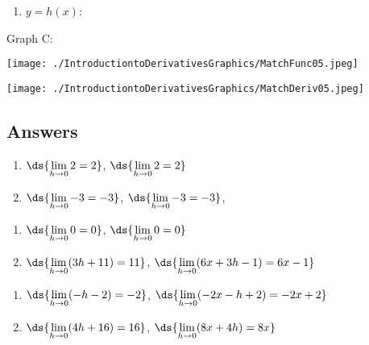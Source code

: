 \documentclass{ximera}
\begin{document}
\begin{center}
\begin{multicols}{2}
\begin{enumerate}
\item \label{MatchFcnDerivative2last}  $y = h(x)$:

\setcounter{HW}{\value{enumi}}
\end{enumerate}

Graph C:

\end{multicols}



\begin{multicols}{2}

\texttt{[image: ./IntroductiontoDerivativesGraphics/MatchFunc05.jpeg]}

\texttt{[image: ./IntroductiontoDerivativesGraphics/MatchDeriv05.jpeg]}

\end{multicols}

\end{center}


\newpage


\subsection{Answers}


\begin{enumerate}

\item $\ds{\lim_{h \rightarrow 0} 2 = 2}$, $\ds{\lim_{h \rightarrow 0} 2 = 2}$
\item $\ds{\lim_{h \rightarrow 0} -3 = -3}$, $\ds{\lim_{h \rightarrow 0} -3 = -3}$,

\setcounter{HW}{\value{enumi}}
\end{enumerate}

\begin{enumerate}
\setcounter{enumi}{\value{HW}}

\item $\ds{\lim_{h \rightarrow 0} 0 = 0}$,  $\ds{\lim_{h \rightarrow 0} 0 = 0}$
\item  $\ds{\lim_{h \rightarrow 0} (3h+11)= 11}$,   $\ds{\lim_{h \rightarrow 0} (6x+3h-1)= 6x-1}$

\setcounter{HW}{\value{enumi}}
\end{enumerate}

\begin{enumerate}
\setcounter{enumi}{\value{HW}}

\item    $\ds{\lim_{h \rightarrow 0} (-h-2) = -2}$,   $\ds{\lim_{h \rightarrow 0} (-2x-h+2) = -2x+2}$   
\item   $\ds{\lim_{h \rightarrow 0} (4h+16) = 16}$,   $\ds{\lim_{h \rightarrow 0} (8x+4h) = 8x}$ 

\setcounter{HW}{\value{enumi}}
\end{enumerate}
\end{document}
